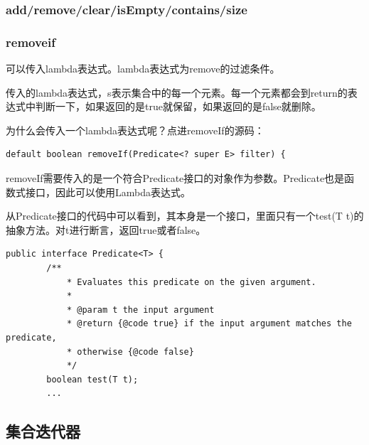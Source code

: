 \subsubsection*{add/remove/clear/isEmpty/contains/size}


\subsubsection*{removeif}
可以传入lambda表达式。lambda表达式为remove的过滤条件。


传入的lambda表达式，s表示集合中的每一个元素。每一个元素都会到return的表达式中判断一下，如果返回的是true就保留，如果返回的是false就删除。

为什么会传入一个lambda表达式呢？点进removeIf的源码：

\begin{lstlisting}[style=Java]
    default boolean removeIf(Predicate<? super E> filter) {
\end{lstlisting}

removeIf需要传入的是一个符合Predicate接口的对象作为参数。Predicate也是函数式接口，因此可以使用Lambda表达式。

从Predicate接口的代码中可以看到，其本身是一个接口，里面只有一个test(T t)的抽象方法。对t进行断言，返回true或者false。

\begin{lstlisting}[style=Java]
    public interface Predicate<T> {
        /**
            * Evaluates this predicate on the given argument.
            *
            * @param t the input argument
            * @return {@code true} if the input argument matches the predicate,
            * otherwise {@code false}
            */
        boolean test(T t);
        ...
\end{lstlisting}

\subsection*{集合迭代器}






